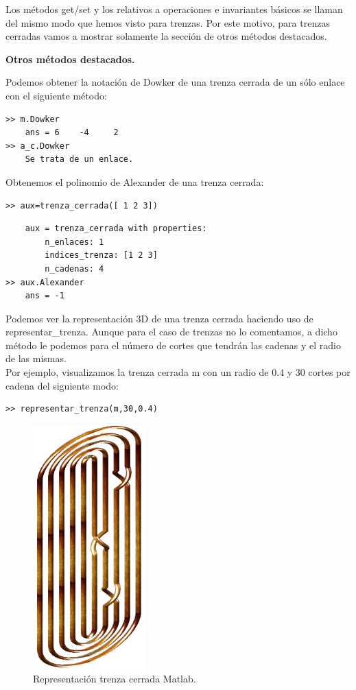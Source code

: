 Los métodos get/set y los relativos a operaciones e invariantes básicos se llaman del mismo modo que hemos visto para trenzas. Por este motivo, para trenzas cerradas vamos a mostrar solamente la sección de otros métodos destacados. 

\bigskip
\begin{center}
	\textbf{Otros métodos destacados. }
\end{center}
Podemos obtener la notación de Dowker de una trenza cerrada de un sólo enlace con el siguiente método:
\begin{lstlisting}
>> m.Dowker
	ans = 6    -4     2
>> a_c.Dowker
	Se trata de un enlace.
\end{lstlisting}

Obtenemos el polinomio de Alexander de una trenza cerrada:
\begin{lstlisting}
>> aux=trenza_cerrada([ 1 2 3])
\end{lstlisting}
\begin{lstlisting}
	aux = trenza_cerrada with properties:
	    n_enlaces: 1
	    indices_trenza: [1 2 3]
	    n_cadenas: 4
>> aux.Alexander
	ans = -1
\end{lstlisting}

Podemos ver la representación 3D de una trenza cerrada haciendo uso de representar\_trenza. Aunque para el caso de trenzas no lo comentamos, a dicho método le podemos para el número de cortes que tendrán las cadenas y el radio de las mismas.\\
Por ejemplo, visualizamos la trenza cerrada m con un radio de 0.4 y 30 cortes por cadena del siguiente modo:

\begin{lstlisting}
>> representar_trenza(m,30,0.4)
\end{lstlisting}
\begin{figure}[h!]
	\centering
	\includegraphics[width=4.3cm]{img/infor4.png}
	\caption{Representación trenza cerrada Matlab.}
	\label{inf3} 
\end{figure}

